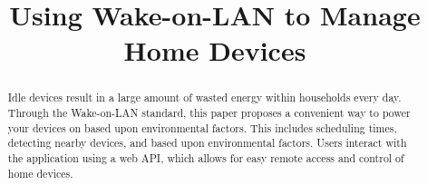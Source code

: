 \documentclass[conference]{IEEEtran}
\begin{document}
\title{Using Wake-on-LAN to Manage Home Devices}

\author{
}

\maketitle

\begin{abstract}
Idle devices result in a large amount of wasted energy within households every day. Through the Wake-on-LAN standard, this paper proposes a convenient way to power your devices on based upon environmental factors. This includes scheduling times, detecting nearby devices, and based upon environmental factors. Users interact with the application using a web API, which allows for easy remote access and control of home devices.
\end{abstract}











\end{document}
